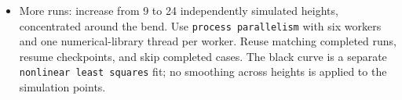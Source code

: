 \documentclass[11pt]{article}
\begin{document}
\begin{itemize}
\item More runs: increase from 9 to 24 independently simulated heights,
concentrated around the bend. Use \verb|process parallelism| with six workers
and one numerical-library thread per worker. Reuse matching completed runs,
resume checkpoints, and skip completed cases. The black curve is a separate
\verb|nonlinear least squares| fit; no smoothing across heights is applied
to the simulation points.

\end{itemize}
\end{document}
